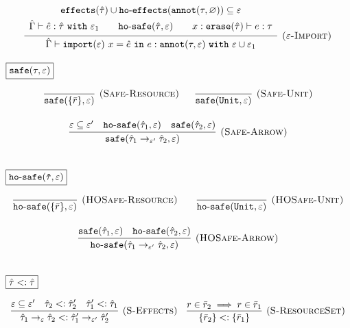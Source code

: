 \documentclass{llncs}
\newcommand{\keywadj}[1]{\mathtt{#1}}
\newcommand{\keyw}[1]{\keywadj{#1}~}
\newcommand{\kw}[1]{\keyw{ #1 }}
\newcommand{\kwa}[1]{\keywadj{ #1 }}
\newcommand{\hyphen}{\hbox{-}}
\newcommand{\hofx}[1]{ \kwa{ho \hyphen effects}(#1) }
\newcommand{\annot}[2]{
	\keywadj{annot}(#1, #2)
}
\begin{document}
\[\begin{array}{c}
\infer[\textsc{($\varepsilon$-Import)}]
	{ \hat \Gamma \vdash \kwa{import}(\varepsilon)~x = \hat e~\kw{in} e: \kwa{annot}(\tau, \varepsilon)~\kw{with} \varepsilon \cup \varepsilon_1 }
{{\def\arraystretch{1.4}
  \begin{array}{c}
\kwa{effects}(\hat \tau) \cup \hofx{\annot{\tau}{\varnothing}}\subseteq \varepsilon \\
\hat \Gamma \vdash \hat e: \hat \tau~\kw{with} \varepsilon_1 ~~~~~~ \kwa{ho \hyphen safe}(\hat \tau, \varepsilon) ~~~~~~ x: \kwa{erase}(\hat \tau) \vdash e: \tau
  \end{array}}} 
 
 
\end{array}
\]

\noindent
$\fbox{$\kwa{safe(\tau, \varepsilon)}$}$

\[
\begin{array}{c}

\infer[\textsc{(Safe-Resource)}]
	{\kwa{safe}(\{ \bar r \}, \varepsilon)}
	{}
~~~~~
\infer[\textsc{(Safe-Unit)}]
	{\kwa{safe}(\kwa{Unit}, \varepsilon)}
	{} \\[3ex]

\infer[\textsc{(Safe-Arrow)}]
	{\kwa{safe}(\hat \tau_1 \rightarrow_{\varepsilon'} \hat \tau_2, \varepsilon)}
	{\varepsilon \subseteq \varepsilon' & \kwa{ho \hyphen safe}(\hat \tau_1, \varepsilon) & \kwa{safe}(\hat \tau_2, \varepsilon)} \\[3ex]

\end{array}
\]

\noindent
$\fbox{$\kwa{ho \hyphen safe(\hat \tau, \varepsilon)}$}$

\[
\begin{array}{c}

\infer[\textsc{(HOSafe-Resource)}]
	{ \kwa{ho \hyphen safe}( \{ \bar r \}, \varepsilon)} 
	{}
	~~~~~~
\infer[\textsc{(HOSafe-Unit)}]
	{ \kwa{ho \hyphen safe}( \kwa{Unit}, \varepsilon)} 
	{}\\[3ex]

\infer[\textsc{(HOSafe-Arrow)}]
	{ \kwa{ho \hyphen safe}( \hat \tau_1 \rightarrow_{\varepsilon'} \hat \tau_2, \varepsilon ) }
	{ \kwa{safe}(\hat \tau_1, \varepsilon)  & \kwa{ho \hyphen safe}(\hat \tau_2, \varepsilon) }\\[3ex]

\end{array}
\]

\noindent
$\fbox{$\hat \tau <: \hat \tau$}$

\[
\begin{array}{c}

\infer[(\textsc{S-Effects})]
	{\hat \tau_1 \rightarrow_{\varepsilon} \hat \tau_2 <: \hat \tau_1' \rightarrow_{\varepsilon'} \hat \tau_2'}
	{\varepsilon \subseteq \varepsilon' & \hat \tau_2 <: \hat \tau_2' & \hat \tau_1' <: \hat \tau_1}
~~~
\infer[(\textsc{S-ResourceSet})]
	{\{ \bar r_2 \} <: \{ \bar r_1 \}}
	{r \in \bar r_2 \implies r \in \bar r_1}


\end{array}
\]
\end{document}
